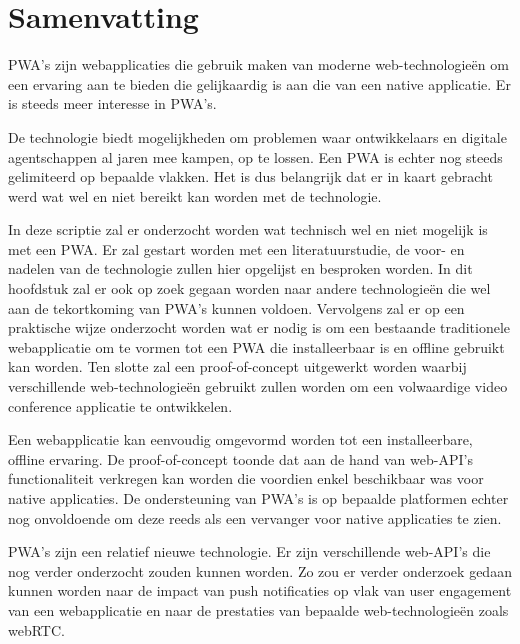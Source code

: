 





\chapter*{Samenvatting}

PWA's zijn webapplicaties die gebruik maken van moderne web-technologieën om een ervaring aan te bieden die gelijkaardig is aan die van een native applicatie. Er is steeds meer interesse in PWA's. \autocite{googleTrends2020}


De technologie biedt mogelijkheden om problemen waar ontwikkelaars en digitale agentschappen al jaren mee kampen, op te lossen.  Een PWA is echter nog steeds gelimiteerd op bepaalde vlakken. 
Het is dus belangrijk dat er in kaart gebracht werd wat wel en niet bereikt kan worden met de technologie.

In deze scriptie zal er onderzocht worden wat technisch wel en niet mogelijk is met een PWA. Er zal gestart worden met een literatuurstudie, de voor- en nadelen van de technologie zullen hier opgelijst en besproken worden.
In dit hoofdstuk zal er ook op zoek gegaan worden naar andere technologieën die wel aan de tekortkoming van PWA's kunnen voldoen.
Vervolgens zal er op een praktische wijze onderzocht worden wat er nodig is om een bestaande traditionele webapplicatie om te vormen tot een PWA die installeerbaar is en offline gebruikt kan worden.
Ten slotte zal een proof-of-concept uitgewerkt worden waarbij verschillende web-technologieën gebruikt zullen worden om een volwaardige video conference applicatie te ontwikkelen. 

Een webapplicatie kan eenvoudig omgevormd worden tot een installeerbare, offline ervaring. De proof-of-concept toonde dat aan de hand van web-API's functionaliteit verkregen kan worden die voordien enkel beschikbaar was voor native applicaties.
De ondersteuning van PWA's is op bepaalde platformen echter nog onvoldoende om deze reeds als een vervanger voor native applicaties te zien.

PWA's zijn een relatief nieuwe technologie. Er zijn verschillende web-API's die nog verder onderzocht zouden kunnen worden. Zo zou er verder onderzoek gedaan kunnen worden naar de impact van push notificaties op vlak van user engagement van een webapplicatie en naar de prestaties van bepaalde web-technologieën zoals webRTC.